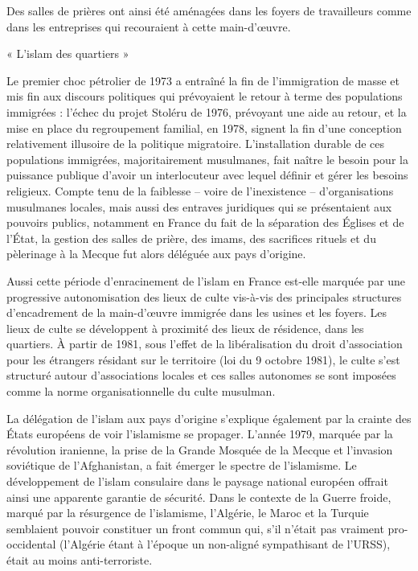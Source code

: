 Des salles de prières ont ainsi été
aménagées dans les foyers de travailleurs comme dans les entreprises qui
recouraient à cette main-d'œuvre.


« L'islam des quartiers »

Le premier choc pétrolier de 1973 a entraîné la fin de l'immigration de
masse et mis fin aux discours politiques qui prévoyaient le retour à
terme des populations immigrées : l'échec du projet Stoléru de 1976,
prévoyant une aide au retour, et la mise en place du regroupement
familial, en 1978, signent la fin d'une conception relativement
illusoire de la politique migratoire. L'installation durable de ces
populations immigrées, majoritairement musulmanes, fait naître le besoin
pour la puissance publique d'avoir un interlocuteur avec lequel définir
et gérer les besoins religieux. Compte tenu de la faiblesse -- voire de
l'inexistence -- d'organisations musulmanes locales, mais aussi des
entraves juridiques qui se présentaient aux pouvoirs publics, notamment
en France du fait de la séparation des Églises et de l'État, la gestion
des salles de prière, des imams, des sacrifices rituels et du pèlerinage
à la Mecque fut alors déléguée aux pays d'origine.

Aussi cette période d'enracinement de l'islam en France est-elle marquée
par une progressive autonomisation des lieux de culte vis-à-vis des
principales structures d'encadrement de la main-d'œuvre immigrée dans
les usines et les foyers. Les lieux de culte se développent à proximité
des lieux de résidence, dans les quartiers. À partir de 1981, sous
l'effet de la libéralisation du droit d'association pour les étrangers
résidant sur le territoire (loi du 9 octobre 1981), le culte s'est
structuré autour d'associations locales et ces salles autonomes se sont
imposées comme la norme organisationnelle du culte musulman.

La délégation de l'islam aux pays d'origine s'explique également par la
crainte des États européens de voir l'islamisme se propager. L'année
1979, marquée par la révolution iranienne, la prise de la Grande Mosquée
de la Mecque et l'invasion soviétique de l'Afghanistan, a fait émerger
le spectre de l'islamisme. Le développement de l'islam consulaire dans
le paysage national européen offrait ainsi une apparente garantie de
sécurité. Dans le contexte de la Guerre froide, marqué par la résurgence
de l'islamisme, l'Algérie, le Maroc et la Turquie semblaient pouvoir
constituer un front commun qui, s'il n'était pas vraiment pro-occidental
(l'Algérie étant à l'époque un non-aligné sympathisant de l'URSS), était
au moins anti-terroriste.

